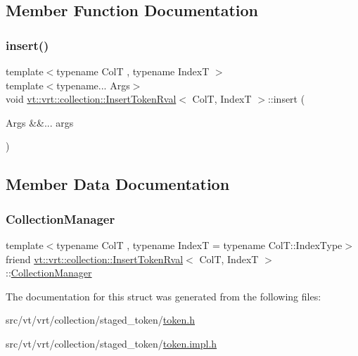 \subsection{Member Function Documentation}
\mbox{\label{structvt_1_1vrt_1_1collection_1_1_insert_token_rval_a24233cafaa4d9a311c757573e3a61352}} 
\subsubsection{\texorpdfstring{insert()}{insert()}}
{\footnotesize\ttfamily template$<$typename ColT , typename IndexT $>$ \\
template$<$typename... Args$>$ \\
void \hyperlink{structvt_1_1vrt_1_1collection_1_1_insert_token_rval}{vt\+::vrt\+::collection\+::\+Insert\+Token\+Rval}$<$ ColT, IndexT $>$\+::insert (\begin{DoxyParamCaption}\item[{Args \&\&...}]{args }\end{DoxyParamCaption})}



\subsection{Member Data Documentation}
\mbox{\label{structvt_1_1vrt_1_1collection_1_1_insert_token_rval_a10b822803e1ad9860efabbb9d979c842}} 
\subsubsection{\texorpdfstring{Collection\+Manager}{CollectionManager}}
{\footnotesize\ttfamily template$<$typename ColT , typename IndexT  = typename Col\+T\+::\+Index\+Type$>$ \\
friend \hyperlink{structvt_1_1vrt_1_1collection_1_1_insert_token_rval}{vt\+::vrt\+::collection\+::\+Insert\+Token\+Rval}$<$ ColT, IndexT $>$\+::\hyperlink{structvt_1_1vrt_1_1collection_1_1_collection_manager}{Collection\+Manager}}



The documentation for this struct was generated from the following files\+:\begin{DoxyCompactItemize}
\item 
src/vt/vrt/collection/staged\+\_\+token/\hyperlink{token_8h}{token.\+h}\item 
src/vt/vrt/collection/staged\+\_\+token/\hyperlink{token_8impl_8h}{token.\+impl.\+h}\end{DoxyCompactItemize}
